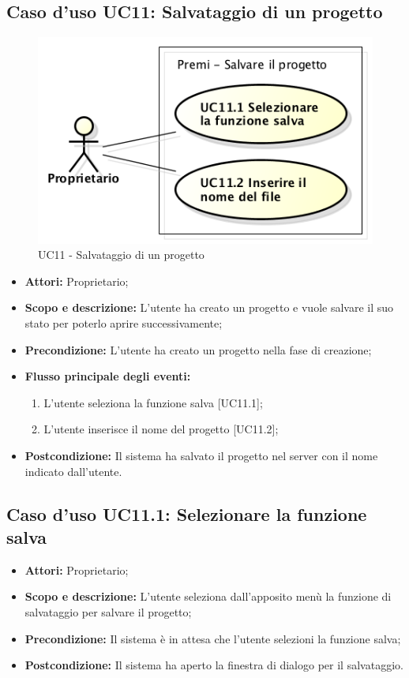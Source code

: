 \subsection{Caso d'uso UC11: Salvataggio di un progetto}
\begin{figure}[h] 
	\centering 
	\includegraphics[scale=0.45] {img/UC11.png} 
	\caption{UC11 - Salvataggio di un progetto} 
\end{figure}

\begin{itemize}
	\item \textbf{Attori:} Proprietario;
	\item \textbf{Scopo e descrizione:} L'utente ha creato un progetto e vuole salvare il suo stato per poterlo aprire successivamente;
	\item \textbf{Precondizione:} L'utente ha creato un progetto nella fase di creazione;
	\item \textbf{Flusso principale degli eventi:}
	\begin{enumerate}
		\item L'utente seleziona la funzione salva [UC11.1];
		\item L'utente inserisce il nome del progetto [UC11.2];
	\end{enumerate}
	\item \textbf{Postcondizione:} Il sistema ha salvato il progetto nel server con il nome indicato dall'utente.
\end{itemize}


\subsection{Caso d'uso UC11.1: Selezionare la funzione salva}
\begin{itemize}
	\item \textbf{Attori:} Proprietario;
	\item \textbf{Scopo e descrizione:} L'utente seleziona dall'apposito menù la funzione di salvataggio per salvare il progetto;
	\item \textbf{Precondizione:} Il sistema è in attesa che l'utente selezioni la funzione salva;
	\item \textbf{Postcondizione:} Il sistema ha aperto la finestra di dialogo per il salvataggio.
\end{itemize}



